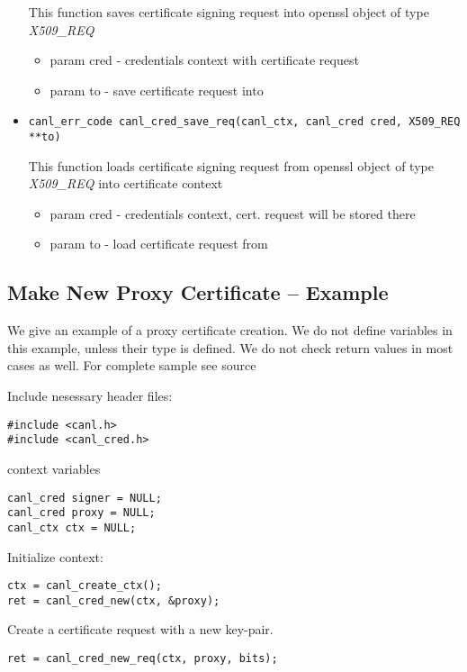 \begin{itemize}
  This function saves certificate signing request into openssl object of type \textit{X509\_REQ}
  \begin{itemize}
    \item param cred - credentials context with certificate request
    \item param to - save certificate request into
  \end{itemize}
  \item \begin{verbatim}
canl_err_code canl_cred_save_req(canl_ctx, canl_cred cred, X509_REQ **to)\end{verbatim}
  This function loads certificate signing request from openssl object of type \textit{X509\_REQ} into \CANL certificate context
  \begin{itemize}
    \item param cred - credentials context, cert. request will be stored there
    \item param to - load certificate request from
  \end{itemize}

\end{itemize}

\subsection{Make New Proxy Certificate -- Example}
We give an example of a proxy certificate creation. We do not 
define variables in this example, unless
their type is \CANL defined. We do not check return values in most
cases as well.
For complete sample see \TODO source

Include nesessary header files:
\begin{lstlisting}
#include <canl.h>
#include <canl_cred.h>
\end{lstlisting}
\CANL context variables
\begin{lstlisting}
canl_cred signer = NULL;
canl_cred proxy = NULL;
canl_ctx ctx = NULL;
\end{lstlisting}

Initialize context:
\begin{lstlisting}
ctx = canl_create_ctx();
ret = canl_cred_new(ctx, &proxy);
\end{lstlisting}

Create a certificate request with a new key-pair.
\begin{lstlisting}
ret = canl_cred_new_req(ctx, proxy, bits);
\end{lstlisting}


